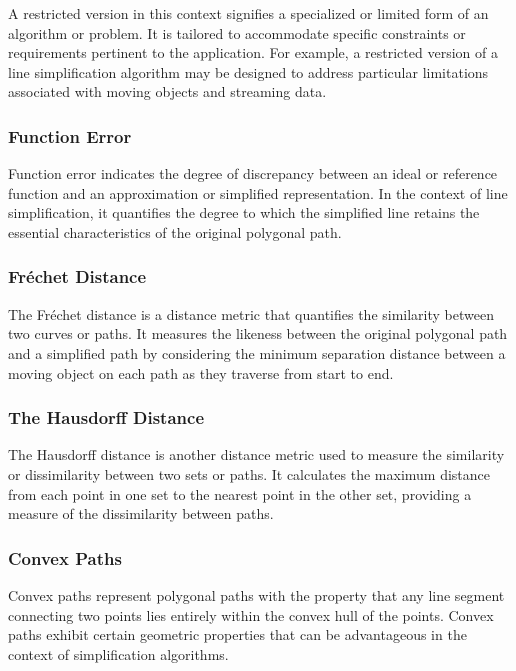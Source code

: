 A restricted version in this context signifies a specialized or limited form of an algorithm or problem. It is tailored to accommodate specific constraints or requirements pertinent to the application. For example, a restricted version of a line simplification algorithm may be designed to address particular limitations associated with moving objects and streaming data.



\subsubsection{Function Error}

Function error indicates the degree of discrepancy between an ideal or reference function and an approximation or simplified representation. In the context of line simplification, it quantifies the degree to which the simplified line retains the essential characteristics of the original polygonal path.

\subsubsection{Fréchet Distance}

The Fréchet distance is a distance metric that quantifies the similarity between two curves or paths. It measures the likeness between the original polygonal path and a simplified path by considering the minimum separation distance between a moving object on each path as they traverse from start to end.


\subsubsection{The Hausdorff Distance}

The Hausdorff distance is another distance metric used to measure the similarity or dissimilarity between two sets or paths. It calculates the maximum distance from each point in one set to the nearest point in the other set, providing a measure of the dissimilarity between paths.


\subsubsection{Convex Paths}

Convex paths represent polygonal paths with the property that any line segment connecting two points lies entirely within the convex hull of the points. Convex paths exhibit certain geometric properties that can be advantageous in the context of simplification algorithms.

